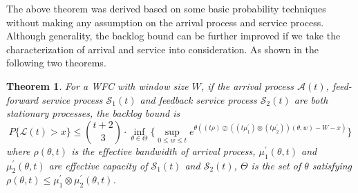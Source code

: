 \documentclass[paper]{ieice}
\newtheorem{theorem}{Theorem}
\begin{document}
The above theorem was derived based on some basic probability techniques without making any assumption on the arrival process and service process. Although generality, the backlog bound can be further improved if we take the characterization of arrival and service into consideration. As shown in the following two theorems.
\begin{theorem}\label{theorem2}
For a WFC with window size $W$, if the arrival process $\mathcal{A}(t)$, feed-forward service process $\mathcal{S}_1(t)$ and feedback service process $\mathcal{S}_2(t)$ are both stationary processes, the backlog bound is
$$P\{\mathcal{L}(t)>x\}\leq {t+2\choose 3}\cdot \inf_{\theta\in\Theta}\{\sup_{0\leq w\leq t}e^{\theta((t\rho)\oslash((t\mu_1^\prime)\otimes(t\mu_2^\prime))(\theta,w)-W-x)}\}$$
where $\rho(\theta,t)$ is the effective bandwidth of arrival process, $\mu_1^\prime(\theta,t)$ and $\mu_2^\prime(\theta,t)$ are effective capacity of $\mathcal{S}_1(t)$ and $\mathcal{S}_2(t)$, $\Theta$ is the set of $\theta$ satisfying $\rho(\theta,t)\leq \mu_1^\prime\otimes\mu_2^\prime(\theta,t)$.
\end{theorem}
\end{document}
